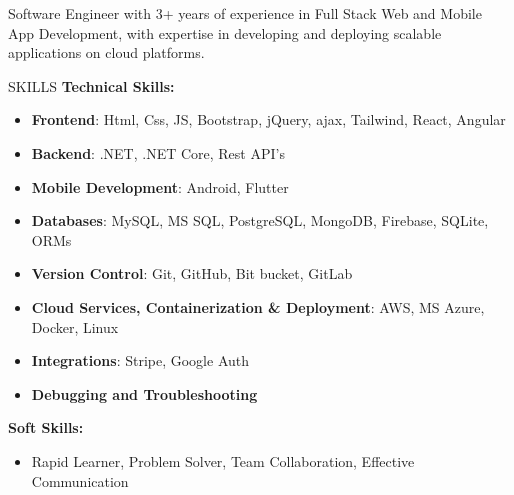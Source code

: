 \documentclass{resume} %
\begin{document}

\begin{rSection}%

{Software Engineer with 3+ years of experience in Full Stack Web and Mobile App Development, with expertise in developing and deploying scalable applications on cloud platforms.}


\end{rSection}


\begin{rSection}{SKILLS}
\textbf{Technical Skills:}
\begin{itemize}
	\item \textbf{Frontend}: Html, Css, JS, Bootstrap, jQuery, ajax, Tailwind, React, Angular
	\item \textbf{Backend}:  .NET, .NET Core, Rest API's
	
	\item \textbf{Mobile Development}: Android, Flutter
	\item \textbf{Databases}: MySQL, MS SQL, PostgreSQL, MongoDB, Firebase, SQLite, ORMs
	\item \textbf{Version Control}: Git, GitHub, Bit bucket, GitLab
	\item \textbf{Cloud Services, Containerization \& Deployment}: AWS, MS Azure, Docker, Linux
	\item \textbf{Integrations}: Stripe, Google Auth
	\item \textbf{Debugging and Troubleshooting}
	
\end{itemize}


\textbf{Soft Skills:} 
\begin{itemize}
\item Rapid Learner, Problem Solver, Team Collaboration, Effective Communication
\end{itemize}


\end{rSection}
\end{document}
